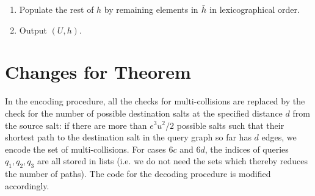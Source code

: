 \begin{enumerate}
\begin{enumerate}[label=(\roman*)]
  \item If $\cs[j]=6c2$ and if the tuple which is at the front of list $L_{6c2}$ has $i$ as the index of $q_1$, then suppose the query listed as $q_3$ had answer $a'$. Let the path $\pth_1$ in the tuple from $a'$ in the query graph end in salt $a''$. Set $h(a,\alpha)\gets a''$ and return $a''$. Remove the tuple from the list $L_{6c2}$.
  \item If $\cs[j]=6d1$ and if the tuple which is at the front of list $L_{6d1}$ has $i$ as the index of $q_1$, then let $a'$ be the salt $a'$ computed when answering the query $q_3$ that corresponded to this tuple. Set $h(a,\alpha)\gets a'$ and return $a'$. Remove the tuple from the list $L_{6d1}$.
  \item If $\cs[j]=6d2$ and if the tuple which is at the front of list $L_{6d2}$ has $i$ as the index of $q_1$, then then let $a'$ be the salt $a'$ computed when answering the query $q_3$ that corresponded to this tuple. Set $h(a,\alpha)\gets a'$ and return $a'$. Remove the tuple from the list $L_{6d3}$.
  \item If $\cs[j]=6d3$ and if the tuple which is at the front of list $L_{6d3}$ has $i$ as the index of $q_1$, then suppose the path $\pth_2$ from the input salt of the query listed as $q_3$ ended in salt $a'$. Set $h(a,\alpha)\gets a'$ and return $a'$. Remove the tuple from the list $L_{6d3}$.
  \item If $\cs[j]=6d3$ and if the tuple which is at the front of list $L_{6d3}$ has $i$ as the index of $q_1$, then suppose the query listed as $q_4$ had answer $a'$. Let the path $\pth_3$ in the tuple from $a'$ in the query graph end in salt $a''$. Set $h(a,\alpha)\gets a''$ and return $a''$. Remove the tuple from the list $L_{6d3}$.
  \item If $\cs[j]=6d4$ and if the tuple which is at the front of list $L_{6d3}$ has $i$ as the index of $q_1$, then suppose the query listed as $q_4$ had answer $a'$. Let the path $\pth_4$ in the tuple from $a'$ in the query graph end in salt $a''$. Set $h(a,\alpha)\gets a''$ and return $a''$. Remove the tuple from the list $L_{6d4}$.
\end{enumerate}
\item Populate the rest of $h$ by remaining elements in $\tilde{h}$ in lexicographical order.
\item Output $(U,h)$.
\end{enumerate}


\section{Changes for Theorem~} 
\label{sec:formal:MDST2}
In the encoding procedure, all the checks for multi-collisions are replaced by the check for the number of possible destination salts at the specified distance $d$ from the source salt: if there are more than $e^3u^2/2$ possible salts such that their shortest path to the destination salt in the query graph so far has $d$ edges, we encode the set of multi-collisions. For cases $6c$ and $6d$, the indices of queries $q_1,q_2,q_3$ are all stored in lists (i.e. we do not need the sets which thereby reduces the number of paths).
The code for the decoding procedure is modified accordingly.